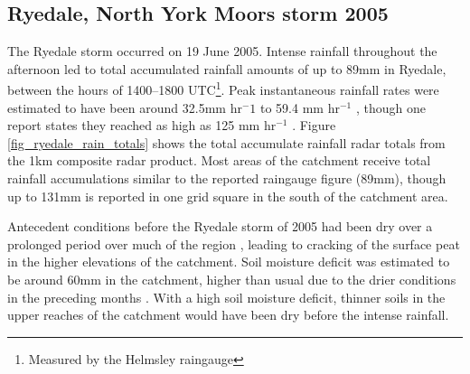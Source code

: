 \subsection{Ryedale, North York Moors storm 2005}
The Ryedale storm occurred on 19 June 2005. Intense rainfall throughout the afternoon led to total accumulated rainfall amounts of up to 89mm in Ryedale, between the hours of 1400--1800 UTC\footnote{Measured by the Helmsley raingauge}. Peak instantaneous rainfall rates were estimated to have been around 32.5mm hr\(^-1\) \citep{sibley2009analysis} to 59.4 mm hr\(^{-1}\) \citep{hopkins2012knowledge}, though one report states they reached as high as 125 mm hr\(^{-1}\) \citep{cinderey2005north}. Figure \ref{fig_ryedale_rain_totals} shows the total accumulate rainfall radar totals from the 1km composite radar product. Most areas of the catchment receive total rainfall accumulations similar to the reported raingauge figure (89mm), though up to 131mm is reported in one grid square in the south of the catchment area.

Antecedent conditions before the Ryedale storm of 2005 had been dry over a prolonged period over much of the region \citep{sibley2009analysis}, leading to cracking of the surface peat in the higher elevations of the catchment. Soil moisture deficit was estimated to be around 60mm in the catchment, higher than usual due to the drier conditions in the preceding months \citep{wass2008investigation}. With a high soil moisture deficit, thinner soils in the upper reaches of the catchment would have been dry before the intense rainfall.


